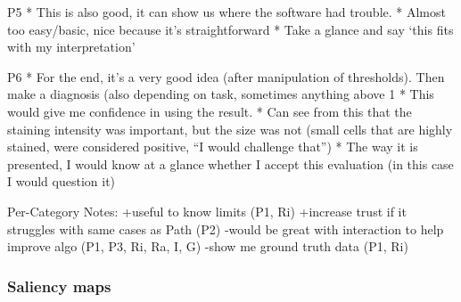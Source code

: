 


P5
* This is also good, it can show us where the software had trouble.
* Almost too easy/basic, nice because it’s straightforward
* Take a glance and say ‘this fits with my interpretation’

P6
* For the end, it’s a very good idea (after manipulation of thresholds). Then make a diagnosis (also depending on task, sometimes anything above 1%
* This would give me confidence in using the result.
* Can see from this that the staining intensity was important, but the size was not (small cells that are highly stained, were considered positive, “I would challenge that”)
* The way it is presented, I would know at a glance whether I accept this evaluation (in this case I would question it)

Per-Category Notes:
+useful to know limits (P1, Ri)
+increase trust if it struggles with same cases as Path (P2)
-would be great with interaction to help improve algo (P1, P3, Ri, Ra, I, G)
-show me ground truth data (P1, Ri)


\subsubsection{Saliency maps}

